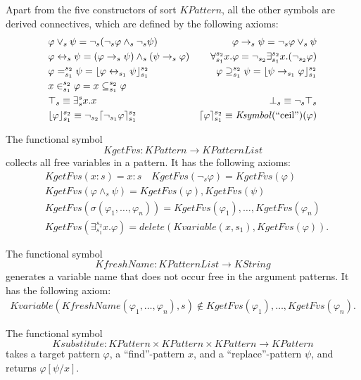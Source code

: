 \documentclass[UTF8]{article}
\theoremstyle{plain}
\theoremstyle{definition}
\theoremstyle{remark}
\newcommand{\cln}{{:}}
\DeclarePairedDelimiter{\ceil}{\lceil}{\rceil}
\DeclarePairedDelimiter{\floor}{\lfloor}{\rfloor}
\newcommand{\KString}{\mathit{KString}}
\newcommand{\Ksymbol}{\mathit{Ksymbol}}
\newcommand{\KPattern}{\mathit{KPattern}}
\newcommand{\KPatternList}{\mathit{KPatternList}}
\newcommand{\Kvariable}{\mathit{Kvariable}}
\newcommand{\kand}{\wedge}
\newcommand{\kor}{\vee}
\newcommand{\kimplies}{\to}
\newcommand{\kiff}{\leftrightarrow}
\newcommand{\knot}{\neg}
\newcommand{\kexists}{\exists}
\newcommand{\kforall}{\forall}
\newcommand{\kequals}{=}
\newcommand{\kcontains}{\supseteq}
\newcommand{\kfloor}{\floor}
\newcommand{\kceil}{\ceil}
\newcommand{\ktop}{\top}
\newcommand{\kbottom}{\bot}
\newcommand{\KgetFvs}{\mathit{KgetFvs}}
\newcommand{\KfreshName}{\mathit{KfreshName}}
\newcommand{\Ksubstitute}{\mathit{Ksubstitute}}
\newcommand{\quot}[1]{\mathrm{``#1"}}
\begin{document}
Apart from the five constructors of sort $\KPattern$, all the other symbols are derived connectives, which are defined by the following axioms:
\begin{align*}
&\varphi \kor_s \psi = \knot_s(\knot_s \varphi \kand_s \knot_s \psi)
&\varphi \kimplies_s \psi = \knot_s \varphi \kor_s \psi
\\
&\varphi \kiff_s \psi = (\varphi \kimplies_s \psi) \kand_s (\psi \kimplies_s \varphi)
&\kforall_{s_1}^{s_2}x.\varphi = \knot_{s_2} \kexists_{s_1}^{s_2} x. (\knot_{s_2} \varphi)
\\
&\varphi \kequals_{s_1}^{s_2} \psi = \kfloor{\varphi \kiff_{s_1} \psi}_{s_1}^{s_2}
&\varphi \kcontains_{s_1}^{s_2} \psi = \kfloor{\psi \kimplies_{s_1} \varphi}_{s_1}^{s_2}
\\
&x \in_{s_1}^{s_2} \varphi = x \subseteq_{s_1}^{s_2} \varphi
\\
&\ktop_s \equiv \kexists_s^s x . x
&\kbottom_s \equiv \knot_s \ktop_s
\\
&\kfloor{\varphi}_{s_1}^{s_2} \equiv \knot_{s_2} \kceil{\knot_{s_1} \varphi}_{s_1}^{s_2}
&\kceil{\varphi}_{s_1}^{s_2} \equiv \Ksymbol(\quot{ceil})(\varphi)
\end{align*}

The functional symbol 
$$\KgetFvs \colon \KPattern \to \KPatternList$$
collects all free variables in a pattern. 
It has the following axioms:
\begin{align*}
&\KgetFvs(x \cln s) = x \cln s \quad \KgetFvs(\knot_s \varphi) = 
\KgetFvs(\varphi)
\\
&\KgetFvs(\varphi \kand_s \psi) = \KgetFvs(\varphi), \KgetFvs(\psi)
\\
&\KgetFvs(\sigma(\varphi_1, \dots, \varphi_n)) = \KgetFvs(\varphi_1), \dots, \KgetFvs(\varphi_n)
\\
&\KgetFvs(\kexists_{s_1}^{s_2} x . \varphi) = \mathit{delete}(\Kvariable(x, 
s_1), \KgetFvs(\varphi)).
\end{align*}

The functional symbol
$$\KfreshName \colon \KPatternList \to \KString$$ 
generates a variable name that does not occur free in the argument patterns.
It has the following axiom:
\begin{align*}
\Kvariable(\KfreshName(\varphi_1,\dots,\varphi_n), s) \not\in \KgetFvs(\varphi_1),\dots,\KgetFvs(\varphi_n).
\end{align*}

The functional symbol
$$\Ksubstitute \colon \KPattern \times \KPattern \times \KPattern \to \KPattern$$
takes a target pattern $\varphi$, a ``find''-pattern $x$, and a ``replace''-pattern $\psi$, and returns $\varphi[\psi / x]$.
\end{document}

